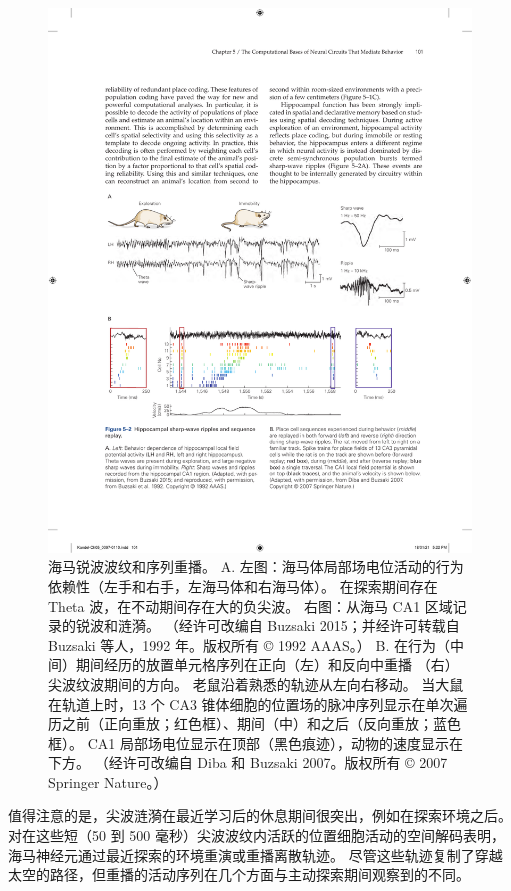 \begin{figure}[htbp]
	\centering
	\includegraphics[width=1.0\linewidth]{chap05/fig_5_2}
	\caption{海马锐波波纹和序列重播。 
		A. 左图：海马体局部场电位活动的行为依赖性（左手和右手，左海马体和右海马体）。 
		在探索期间存在 Theta 波，在不动期间存在大的负尖波。 
		右图：从海马 CA1 区域记录的锐波和涟漪。 （经许可改编自 Buzsaki 2015；并经许可转载自 Buzsaki 等人，1992 年。版权所有 © 1992 AAAS。）
		B. 在行为（中间）期间经历的放置单元格序列在正向（左）和反向中重播 （右）尖波纹波期间的方向。 
		老鼠沿着熟悉的轨迹从左向右移动。 
		当大鼠在轨道上时，13 个 CA3 锥体细胞的位置场的脉冲序列显示在单次遍历之前（正向重放；红色框）、期间（中）和之后（反向重放；蓝色框）。 CA1 局部场电位显示在顶部（黑色痕迹），动物的速度显示在下方。 
		（经许可改编自 Diba 和 Buzsaki 2007。版权所有 © 2007 Springer Nature。）}
	\label{fig:5_2}
\end{figure}


值得注意的是，尖波涟漪在最近学习后的休息期间很突出，例如在探索环境之后。 
对在这些短（50 到 500 毫秒）尖波波纹内活跃的位置细胞活动的空间解码表明，海马神经元通过最近探索的环境重演或重播离散轨迹。 
尽管这些轨迹复制了穿越太空的路径，但重播的活动序列在几个方面与主动探索期间观察到的不同。



